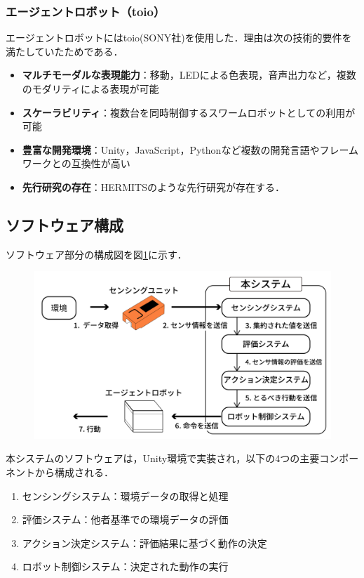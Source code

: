 \documentclass{cuxarticle}
\begin{document}
\subsubsection{エージェントロボット（toio）}
エージェントロボットにはtoio(SONY社)\cite{--小さなキ}を使用した．理由は次の技術的要件を満たしていたためである．

\begin{itemize}
  \item \textbf{マルチモーダルな表現能力}：移動，LEDによる色表現，音声出力など，複数のモダリティによる表現が可能
  \item \textbf{スケーラビリティ}：複数台を同時制御するスワームロボットとしての利用が可能
  \item \textbf{豊富な開発環境}：Unity，JavaScript，Pythonなど複数の開発言語やフレームワークとの互換性が高い
  \item \textbf{先行研究の存在}：HERMITS\cite{--HERMITSProceedings33rdAnnual}のような先行研究が存在する．
\end{itemize}

\subsection{ソフトウェア構成}
ソフトウェア部分の構成図を図\ref{fig:software-architecture}に示す．
\begin{figure}[h]
  \centering
  \includegraphics[keepaspectratio, width=0.6\columnwidth]{resources/system_structure.png}
  \caption[short]{}
  \label{fig:software-architecture}
\end{figure}

本システムのソフトウェアは，Unity環境で実装され，以下の4つの主要コンポーネントから構成される．

\begin{enumerate}
  \item センシングシステム：環境データの取得と処理
  \item 評価システム：他者基準での環境データの評価
  \item アクション決定システム：評価結果に基づく動作の決定
  \item ロボット制御システム：決定された動作の実行
\end{enumerate}
\end{document}
